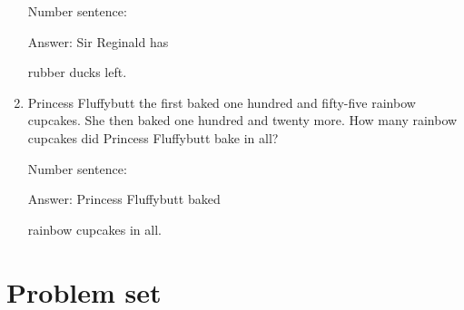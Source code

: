 \documentclass{tufte-book}
\begin{document}
\begin{enumerate}
  Number sentence:
  \dotfill\medskip\par
  Answer: Sir Reginald has
  \dotfill\medskip\par\mbox{}\dotfill\medskip\par\mbox{}\dotfill\bigskip
  rubber ducks left.
\item
  Princess Fluffybutt the first baked one hundred and fifty-five rainbow
  cupcakes. She then baked one hundred and twenty more. How many rainbow
  cupcakes did Princess Fluffybutt bake in all?\medskip\par
  Number sentence:
  \dotfill\medskip\par
  Answer: Princess Fluffybutt baked
  \dotfill\medskip\par\mbox{}\dotfill\medskip\par\mbox{}\dotfill\bigskip
  rainbow cupcakes in all.
\end{enumerate}


\clearpage\section{Problem set }
\end{document}
